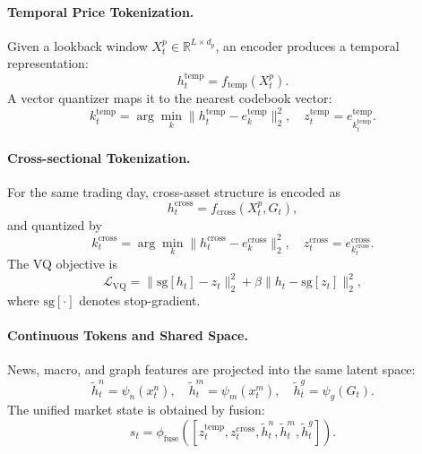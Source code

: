 \documentclass[letterpaper]{article}
\begin{document}
\paragraph{Temporal Price Tokenization.}
Given a lookback window $X_t^p \in \mathbb{R}^{L \times d_p}$, an encoder produces a temporal representation:
\begin{equation}
    h_t^{\mathrm{temp}} = f_{\mathrm{temp}}(X_t^p).
\end{equation}
A vector quantizer maps it to the nearest codebook vector:
\begin{equation}
    k_t^{\mathrm{temp}} = \arg\min_k \|h_t^{\mathrm{temp}} - e_k^{\mathrm{temp}}\|_2^2,
    \quad
    z_t^{\mathrm{temp}} = e_{k_t^{\mathrm{temp}}}^{\mathrm{temp}}.
\end{equation}

\paragraph{Cross-sectional Tokenization.}
For the same trading day, cross-asset structure is encoded as
\begin{equation}
    h_t^{\mathrm{cross}} = f_{\mathrm{cross}}(X_t^p, G_t),
\end{equation}
and quantized by
\begin{equation}
    k_t^{\mathrm{cross}} = \arg\min_k \|h_t^{\mathrm{cross}} - e_k^{\mathrm{cross}}\|_2^2,
    \quad
    z_t^{\mathrm{cross}} = e_{k_t^{\mathrm{cross}}}^{\mathrm{cross}}.
\end{equation}
The VQ objective is
\begin{equation}
    \mathcal{L}_{\mathrm{VQ}} =
    \| \mathrm{sg}[h_t] - z_t \|_2^2
    + \beta \| h_t - \mathrm{sg}[z_t] \|_2^2,
\end{equation}
where $\mathrm{sg}[\cdot]$ denotes stop-gradient.

\paragraph{Continuous Tokens and Shared Space.}
News, macro, and graph features are projected into the same latent space:
\begin{equation}
    \tilde{h}_t^n = \psi_n(x_t^n), \quad
    \tilde{h}_t^m = \psi_m(x_t^m), \quad
    \tilde{h}_t^g = \psi_g(G_t).
\end{equation}
The unified market state is obtained by fusion:
\begin{equation}
    s_t = \phi_{\mathrm{fuse}}\left(
    [z_t^{\mathrm{temp}}, z_t^{\mathrm{cross}}, \tilde{h}_t^n, \tilde{h}_t^m, \tilde{h}_t^g]
    \right).
\end{equation}
\end{document}
